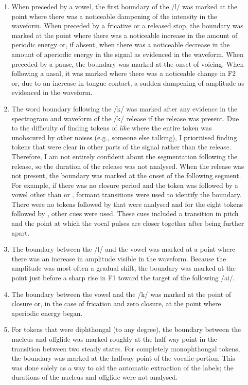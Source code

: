 \begin{enumerate}
	\item When preceded by a vowel, the first boundary of the /l/ was marked at the point where there was a noticeable dampening of the intensity in the waveform.  When preceded by a fricative or a released stop, the boundary was marked at the point where there was a noticeable increase in the amount of periodic energy or, if absent, when there was a noticeable decrease in the amount of aperiodic energy in the signal as evidenced in the waveform.  When preceded by a pause, the boundary was marked at the onset of voicing.  When following a nasal, it was marked where there was a noticeable change in F2 or, due to an increase in tongue contact, a sudden dampening of amplitude as evidenced in the waveform.
	\item The word boundary following the /k/ was marked after any evidence in the spectrogram and waveform of the /k/ release if the release was present.  Due to the difficulty of finding tokens of \textit{like} where the entire token was unobscured by other noises (e.g., someone else talking), I prioritised finding tokens that were clear in other parts of the signal rather than the release.  Therefore, I am not entirely confident about the segmentation following the release, so the duration of the release was not analysed.  When the release was not present, the boundary was marked at the onset of the following segment.  For example, if there was no closure period and the token was followed by a vowel other than  or , formant transitions were used to identify the boundary.  There were no tokens followed by  that were analysed and for the eight tokens followed by , other cues were used.  These cues included a transition in pitch and the point at which the vocal pulses are closer together after being further apart.
	\item The boundary between the /l/ and the vowel was marked at a point where there was an increase in amplitude visible in the waveform.  Because the amplitude was most often a gradual shift, the boundary was marked at the point just before a sharp rise in F1 toward the target of the following /ai/.
	\item The boundary between the vowel and the /k/ was marked at the point of closure or, in the case of frication and zero closure, at the point where aperiodic energy began.
	\item For tokens that were diphthongal (to any degree), the boundary between the nucleus and offglide was marked roughly at the half-way point in the transition between two steady states.  For completely monophthongal tokens, the boundary was marked at the halfway point of the vocalic portion.  This was done solely as a way to aid the automatic extraction of the labels; the durations of the nucleus and offglide were not analysed.
	
\end{enumerate}

